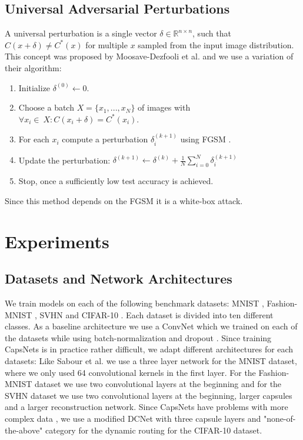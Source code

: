 \documentclass{article}
\begin{document}
\subsection{Universal Adversarial Perturbations}
A universal perturbation is a single vector $\delta \in \mathbb{R}^{n\times n}$, such that $C(x + \delta) \neq C^*(x)$ for multiple $x$ sampled from the input image distribution. This concept was proposed by Moosave-Dezfooli et al.  and we use a variation of their algorithm:
\begin{enumerate}
	\item Initialize $\delta^{(0)} \gets 0$.
	\item Choose a batch $X = \{x_1, ..., x_N\}$ of images with $\forall x_i \in\ X:  C(x_i + \delta) = C^*(x_i)$.
	\item For each $x_i$ compute a perturbation $\delta_i^{(k+1)}$ using FGSM \cite{fgsm}.
	\item Update the perturbation: $\delta^{(k+1)} \gets \delta^{(k)} + \frac{1}{N} \sum\limits_{i=0}^N \delta_i^{(k+1)}$
	\item Stop, once a sufficiently low test accuracy is achieved.
\end{enumerate}
Since this method depends on the FGSM \cite{fgsm} it is a white-box attack.


\section{Experiments}
\label{lab:experiments}

\subsection{Datasets and Network Architectures}

We train models on each of the following benchmark datasets: MNIST \cite{mnist}, Fashion-MNIST \cite{fashion}, SVHN \cite{svhn} and CIFAR-10 \cite{cifar}. Each dataset is divided into ten different classes. 
As a baseline architecture we use a ConvNet which we trained on each of the datasets while using batch-normalization \cite{batchnorm} and dropout \cite{dropout}. Since training CapsNets is in practice rather difficult, we adapt different architectures for each datasets: Like Sabour et al.  we use a three layer network for the MNIST dataset, where we only used 64 convolutional kernels in the first layer. For the Fashion-MNIST dataset we use two convolutional layers at the beginning and for the SVHN dataset we use two convolutional layers at the beginning, larger capsules and a larger reconstruction network. Since CapsNets have problems with more complex data \cite{complex}, we use a modified DCNet \cite{denseanddiverse} with three capsule layers and "none-of-the-above" category for the dynamic routing \cite{capsules} for the CIFAR-10 dataset.
\end{document}
